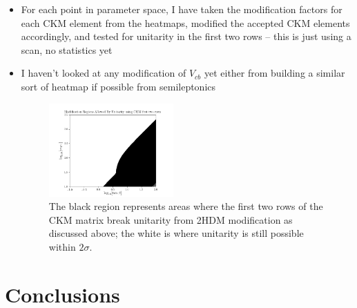 \documentclass[11pt]{article}
\begin{document}
\begin{itemize}
    \item For each point in parameter space, I have taken the modification factors for each CKM element from the heatmaps, modified the accepted CKM elements accordingly, and tested for unitarity in the first two rows -- this is just using a scan, no statistics yet
    \item I haven't looked at any modification of $V_{cb}$ yet either from building a similar sort of heatmap if possible from semileptonics
\begin{figure}[H]
    \centering
    \includegraphics[width=0.45\textwidth]{heatmaps/ckm_mod_2sig.png}
    \caption{The black region represents areas where the first two rows of the CKM matrix break unitarity from 2HDM modification as discussed above; the white is where unitarity is still possible within $2\sigma$.}
\end{figure}
\end{itemize}

\section{Conclusions}
\end{document}
